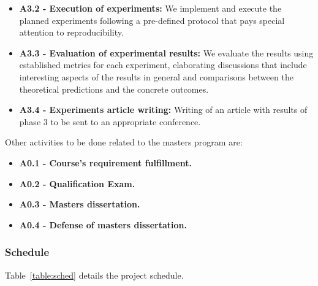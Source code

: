 \documentclass[12pt]{article}
\begin{document}
\begin{itemize}
    \item \textbf{A3.2 - Execution of experiments:}
        We implement and execute the planned experiments following a pre-defined protocol that
        pays special attention to reproducibility.

    \item \textbf{A3.3 - Evaluation of experimental results:}
        We evaluate the results using established metrics for each experiment,
        elaborating discussions that include interesting aspects of the results in general and
        comparisons between the theoretical predictions and the concrete outcomes.

    \item \textbf{A3.4 - Experiments article writing:}
        Writing of an article with results of phase $3$ to be sent to an appropriate conference.
\end{itemize}

Other activities to be done related to the masters program are:
\begin{itemize}
    \item \textbf{A0.1 - Course's requirement fulfillment.}
    \item \textbf{A0.2 - Qualification Exam.}
    \item \textbf{A0.3 - Masters dissertation.}
    \item \textbf{A0.4 - Defense of masters dissertation.}
\end{itemize}

\subsubsection{Schedule}
Table~\ref{table:sched} details the project schedule.
\end{document}
